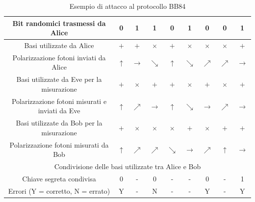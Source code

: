 \setlength\doublerulesep{0.3cm} 
\begin{table}[H]
\centering
    \begin{tabular}{|c|c|c|c|c|c|c|c|c|}
    \hline
    Bit randomici trasmessi da Alice & 0 & 1 & 1 & 0 & 1 & 0 & 0 & 1\\
    \hline \hline
    Basi utilizzate da Alice & $+$ & $+$ & $\times$ & $+$ & $\times$ & $\times$ & $\times$ & $+$\\
    \hline
    Polarizzazione fotoni inviati da Alice & $\uparrow$ & $\rightarrow$ & $\searrow$ & $\uparrow$ & $\searrow$ & $\nearrow$ & $\nearrow$ & $\rightarrow$\\
    \hline \hline
    Basi utilizzate da Eve per la misurazione & $+$ & $\times$ & $+$ & $+$ & $\times$ & $+$ & $\times$ & $+$\\
    \hline
    Polarizzazione fotoni misurati e inviati da Eve & $\uparrow$ & $\nearrow$ & $\rightarrow$ & $\uparrow$ & $\searrow$ & $\rightarrow$ & $\nearrow$ & $\rightarrow$\\
    \hline \hline
    Basi utilizzate da Bob per la misurazione & $+$ & $\times$ & $\times$ & $\times$ & $+$ & $\times$ & $+$ & $+$\\
    \hline
    Polarizzazione fotoni misurati da Bob & $\uparrow$ & $\nearrow$ & $\nearrow$ & $\searrow$ & $\rightarrow$ & $\nearrow$ & $\uparrow$ & $\rightarrow$\\
    \hline \hline
    \multicolumn{9}{|c|}{Condivisione delle basi utilizzate tra Alice e Bob}\\
    \hline \hline 
    Chiave segreta condivisa & 0 & - & 0 & - & - & 0 & - & 1 \\
    \hline 
    Errori (Y = corretto, N = errato) & Y & - & N & - & - & Y & - & Y \\
    \hline 
    \end{tabular}
    \caption{Esempio di attacco al protocollo BB84}
    \label{tab:BB84attack}
\end{table}

